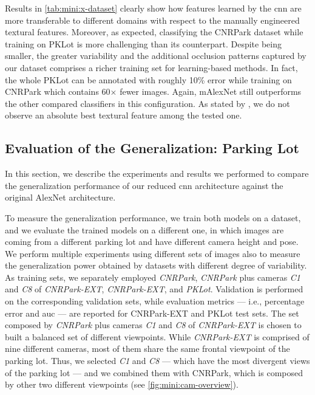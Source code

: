 Results in \ref{tab:mini:x-dataset} clearly show how features learned by the \gls{cnn} are more transferable to different domains with respect to the manually engineered textural features.
Moreover, as expected, classifying the CNRPark dataset while training on PKLot is more challenging than its counterpart.
Despite being smaller, the greater variability and the additional occlusion patterns captured by our dataset comprises a richer training set for learning-based methods.
In fact, the whole PKLot can be annotated with roughly 10\% error while training on CNRPark which contains 60$\times$ fewer images.
Again, mAlexNet still outperforms the other compared classifiers in this configuration.
As stated by \citet{de2015pklot}, we do not observe an absolute best textural feature among the tested one.


\subsection{Evaluation of the Generalization: Parking Lot}
\label{subsec:mini:generalization}

In this section, we describe the experiments and results we performed to compare the generalization performance of our reduced \gls{cnn} architecture against the original AlexNet architecture.

To measure the generalization performance, we train both models on a dataset, and we evaluate the trained models on a different one, in which images are coming from a different parking lot and have different camera height and pose.
We perform multiple experiments using different sets of images also to measure the generalization power obtained by datasets with different degree of variability.
As training sets, we separately employed \emph{CNRPark}, \emph{CNRPark} plus cameras \emph{C1} and \emph{C8} of \emph{CNRPark-EXT}, \emph{CNRPark-EXT}, and \emph{PKLot}.
Validation is performed on the corresponding validation sets, while evaluation metrics --- i.e., percentage error and \gls{auc} --- are reported for CNRPark-EXT and PKLot test sets.
The set composed by \emph{CNRPark} plus cameras \emph{C1} and \emph{C8} of \emph{CNRPark-EXT} is chosen to built a balanced set of different viewpoints.
While \emph{CNRPark-EXT} is comprised of nine different cameras, most of them share the same frontal viewpoint of the parking lot.
Thus, we selected \emph{C1} and \emph{C8} --- which have the most divergent views of the parking lot --- and we combined them with CNRPark, which is composed by other two different viewpoints (see \ref{fig:mini:cam-overview}).

